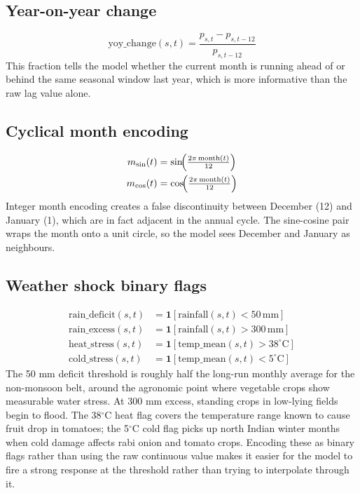 \documentclass[conference,twoside]{IEEEtran}
\begin{document}
\subsection{Year-on-year change}
\begin{equation}
\text{yoy\_change}(s,t) = \frac{p_{s,t} - p_{s,t-12}}{p_{s,t-12}}
\label{eq:yoy}
\end{equation}
This fraction tells the model whether the current month is running ahead of or behind the same seasonal window last year, which is more informative than the raw lag value alone.

\subsection{Cyclical month encoding}
\begin{align}
m_{\sin}(t) &= \sin\!\Bigl(\tfrac{2\pi\,\text{month}(t)}{12}\Bigr) \label{eq:msin}\\
m_{\cos}(t) &= \cos\!\Bigl(\tfrac{2\pi\,\text{month}(t)}{12}\Bigr) \label{eq:mcos}
\end{align}
Integer month encoding creates a false discontinuity between December (12) and January (1), which are in fact adjacent in the annual cycle. The sine-cosine pair wraps the month onto a unit circle, so the model sees December and January as neighbours.

\subsection{Weather shock binary flags}
\begin{align}
\text{rain\_deficit}(s,t)  &= \mathbf{1}\!\left[\text{rainfall}(s,t) < 50\,\text{mm}\right] \label{eq:rain_def}\\
\text{rain\_excess}(s,t)   &= \mathbf{1}\!\left[\text{rainfall}(s,t) > 300\,\text{mm}\right] \label{eq:rain_exc}\\
\text{heat\_stress}(s,t)   &= \mathbf{1}\!\left[\text{temp\_mean}(s,t) > 38^{\circ}\text{C}\right] \label{eq:heat}\\
\text{cold\_stress}(s,t)   &= \mathbf{1}\!\left[\text{temp\_mean}(s,t) < 5^{\circ}\text{C}\right] \label{eq:cold}
\end{align}
The 50 mm deficit threshold is roughly half the long-run monthly average for the non-monsoon belt, around the agronomic point where vegetable crops show measurable water stress. At 300 mm excess, standing crops in low-lying fields begin to flood. The 38$^\circ$C heat flag covers the temperature range known to cause fruit drop in tomatoes; the 5$^\circ$C cold flag picks up north Indian winter months when cold damage affects rabi onion and tomato crops. Encoding these as binary flags rather than using the raw continuous value makes it easier for the model to fire a strong response at the threshold rather than trying to interpolate through it.
\end{document}
